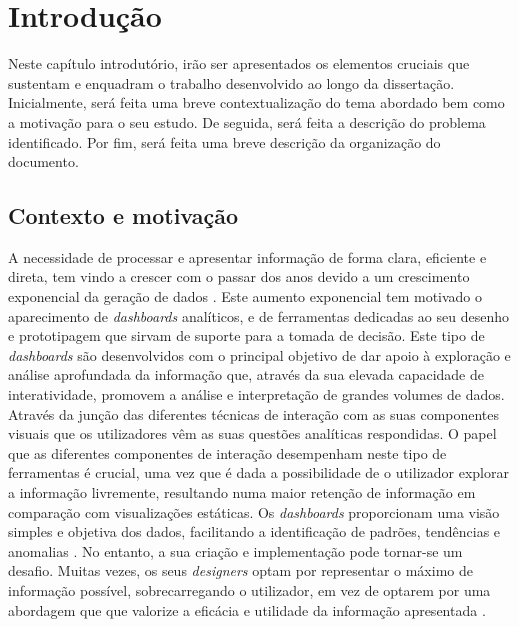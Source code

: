 
%

\chapter{Introdução}
\label{cha:introducao}

Neste capítulo introdutório, irão ser apresentados os elementos cruciais que sustentam e enquadram o trabalho desenvolvido ao longo da dissertação. Inicialmente, será feita uma breve contextualização do tema abordado bem como a motivação para o seu estudo. De seguida, será feita a descrição do problema identificado. Por fim, será feita uma breve descrição da organização do documento.

\section{Contexto e motivação}
\label{sec:cont_e_motiv}

A necessidade de processar e apresentar informação de forma clara, eficiente e direta, tem vindo a crescer com o passar dos anos devido a um crescimento exponencial da geração de dados \cite{kitchin2014data}. Este aumento exponencial tem motivado o aparecimento de \textit{dashboards} analíticos, e de ferramentas dedicadas ao seu desenho e prototipagem que sirvam de suporte para a tomada de decisão. Este tipo de \textit{dashboards} são desenvolvidos com o principal objetivo de dar apoio à exploração e análise aprofundada da informação que, através da sua elevada capacidade de interatividade, promovem a análise e interpretação de grandes volumes de dados. Através da junção das diferentes técnicas de interação com as suas componentes visuais que os utilizadores vêm as suas questões analíticas respondidas. O papel que as diferentes componentes de interação desempenham neste tipo de ferramentas é crucial, uma vez que é dada a possibilidade de o utilizador explorar a informação livremente, resultando numa maior retenção de informação em comparação com visualizações estáticas. Os \textit{dashboards} proporcionam uma visão simples e objetiva dos dados, facilitando a identificação de padrões, tendências e anomalias \cite{few2006information}. No entanto, a sua criação e implementação pode tornar-se um desafio. Muitas vezes, os seus \textit{designers} optam por representar o máximo de informação possível, sobrecarregando o utilizador, em vez de optarem por uma abordagem que que valorize a eficácia e utilidade da informação apresentada \cite{eckerson2010performance}.

